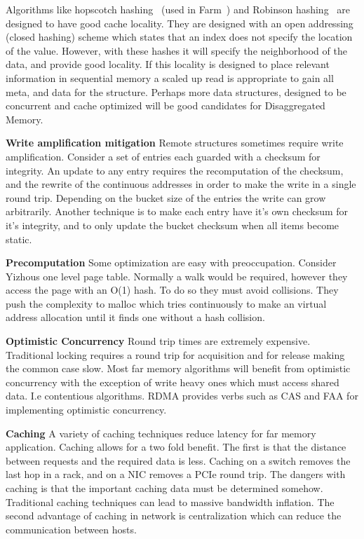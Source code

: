 Algorithms like hopscotch hashing~\cite{hopscotch} (used in Farm~\cite{farm})
and Robinson hashing~\cite{robinhood} are designed to have good cache locality.
They are designed with an open addressing (closed hashing) scheme which states
that an index does not specify the location of the value. However, with these
hashes it will specify the neighborhood of the data, and provide good locality.
If this locality is designed to place relevant information in sequential memory
a scaled up read is appropriate to gain all meta, and data for the structure.
Perhaps more data structures, designed to be concurrent and cache optimized will
be good candidates for Disaggregated Memory.

\textbf{Write amplification mitigation} Remote structures sometimes require write
amplification. Consider a set of entries each guarded with a checksum for
integrity. An update to any entry requires the recomputation of the checksum,
and the rewrite of the continuous addresses in order to make the write in a
single round trip. Depending on the bucket size of the entries the write can
grow arbitrarily. Another technique is to make each entry have it's own checksum
for it's integrity, and to only update the bucket checksum when all items become
static.

\textbf{Precomputation} Some optimization are easy with preoccupation. Consider
Yizhous one level page table. Normally a walk would be required, however they
access the page with an O(1) hash. To do so they must avoid collisions. They
push the complexity to malloc which tries continuously to make an virtual address
allocation until it finds one without a hash collision.

\textbf{Optimistic Concurrency} Round trip times are extremely expensive.
Traditional locking requires a round trip for acquisition and for release making
the common case slow. Most far memory algorithms will benefit from optimistic
concurrency with the exception of write heavy ones which must access shared
data. I.e contentious algorithms. RDMA provides verbs such as CAS and FAA for
implementing optimistic concurrency.

\textbf{Caching} A variety of caching techniques reduce latency for far memory
application. Caching allows for a two fold benefit. The first is that the
distance between requests and the required data is less. Caching on a switch
removes the last hop in a rack, and on a NIC removes a PCIe round trip. The
dangers with caching is that the important caching data must be determined
somehow. Traditional caching techniques can lead to massive bandwidth inflation.
The second advantage of caching in network is centralization which can reduce
the communication between hosts.

